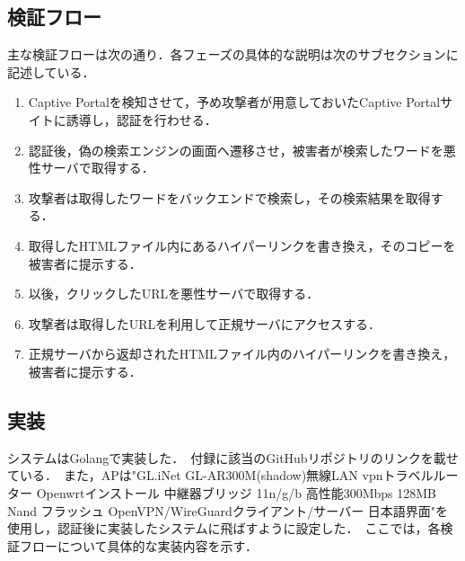 \documentclass[dvipdfmx,twocolumn]{jsarticle}
\begin{document}
        \subsection{検証フロー}
            主な検証フローは次の通り．各フェーズの具体的な説明は次のサブセクションに記述している．
            \begin{enumerate}
                \item Captive Portalを検知させて，予め攻撃者が用意しておいたCaptive Portalサイトに誘導し，認証を行わせる．
                \item 認証後，偽の検索エンジンの画面へ遷移させ，被害者が検索したワードを悪性サーバで取得する．
                \item 攻撃者は取得したワードをバックエンドで検索し，その検索結果を取得する．
                \item 取得したHTMLファイル内にあるハイパーリンクを書き換え，そのコピーを被害者に提示する．
                \item 以後，クリックしたURLを悪性サーバで取得する．
                \item 攻撃者は取得したURLを利用して正規サーバにアクセスする．
                \item 正規サーバから返却されたHTMLファイル内のハイパーリンクを書き換え，被害者に提示する．
            \end{enumerate}
        \subsection{実装}
            システムはGolangで実装した．\
            付録に該当のGitHubリポジトリのリンクを載せている．\
            また，APは"GL.iNet GL-AR300M(shadow)無線LAN vpnトラベルルーター Openwrtインストール 中継器ブリッジ 11n/g/b 高性能300Mbps 128MB Nand フラッシュ OpenVPN/WireGuardクライアント/サーバー 日本語界面"を使用し，認証後に実装したシステムに飛ばすように設定した．\
            ここでは，各検証フローについて具体的な実装内容を示す．\
\end{document}
